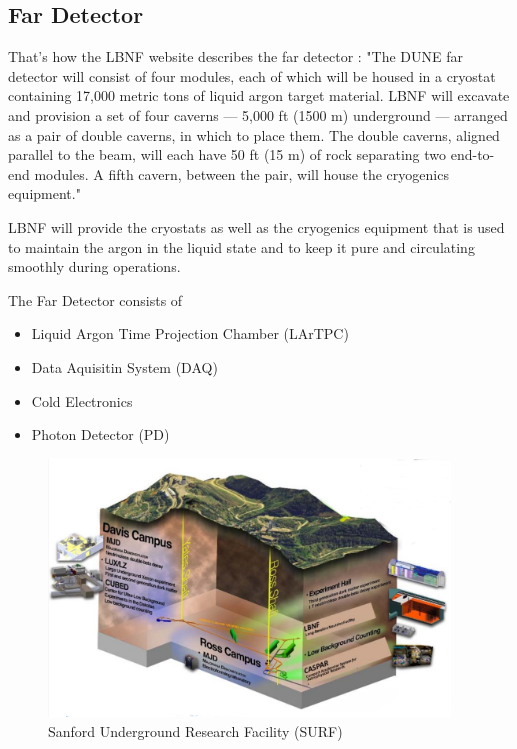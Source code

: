 \subsection{Far Detector}

That's how the LBNF website describes the far detector \cite{ref_LBNFweb}: "The DUNE far detector will consist of four modules, each of which will be housed in a cryostat containing 17,000 metric tons of liquid argon target material. LBNF will excavate and provision a set of four caverns — 5,000 ft (1500 m) underground — arranged as a pair of double caverns, in which to place them. The double caverns, aligned parallel to the beam, will each have 50 ft (15 m) of rock separating two end-to-end modules. A fifth cavern, between the pair, will house the cryogenics equipment."

LBNF will provide the cryostats as well as the cryogenics equipment that is used to maintain the argon in the liquid state and to keep it pure and circulating smoothly during operations. 

The Far Detector consists of 
\begin{itemize}
  \item Liquid Argon Time Projection Chamber (LArTPC)
  \item Data Aquisitin System (DAQ)
  \item Cold Electronics
  \item Photon Detector (PD)
\end{itemize}

\begin{figure}
\caption{Sanford Underground Research Facility (SURF)}
\label{fig:farDetector_SURF1}
\centering
\includegraphics[width=0.95\textwidth, keepaspectratio=true]{figs/farDetector_SanfordUndergroundResearchFacility.png}
\end{figure}

